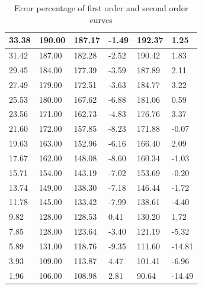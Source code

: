 \begin{table}[!hbt]
\begin{tabular}{|ll|l|l|l|l|}
\multicolumn{1}{|l|}{33.38} & 190.00 & 187.17 & -1.49 & 192.37 & 1.25 \\ \hline
\multicolumn{1}{|l|}{31.42} & 187.00 & 182.28 & -2.52 & 190.42 & 1.83 \\ \hline
\multicolumn{1}{|l|}{29.45} & 184.00 & 177.39 & -3.59 & 187.89 & 2.11 \\ \hline
\multicolumn{1}{|l|}{27.49} & 179.00 & 172.51 & -3.63 & 184.77 & 3.22 \\ \hline
\multicolumn{1}{|l|}{25.53} & 180.00 & 167.62 & -6.88 & 181.06 & 0.59 \\ \hline
\multicolumn{1}{|l|}{23.56} & 171.00 & 162.73 & -4.83 & 176.76 & 3.37 \\ \hline
\multicolumn{1}{|l|}{21.60} & 172.00 & 157.85 & -8.23 & 171.88 & -0.07 \\ \hline
\multicolumn{1}{|l|}{19.63} & 163.00 & 152.96 & -6.16 & 166.40 & 2.09 \\ \hline
\multicolumn{1}{|l|}{17.67} & 162.00 & 148.08 & -8.60 & 160.34 & -1.03 \\ \hline
\multicolumn{1}{|l|}{15.71} & 154.00 & 143.19 & -7.02 & 153.69 & -0.20 \\ \hline
\multicolumn{1}{|l|}{13.74} & 149.00 & 138.30 & -7.18 & 146.44 & -1.72 \\ \hline
\multicolumn{1}{|l|}{11.78} & 145.00 & 133.42 & -7.99 & 138.61 & -4.40 \\ \hline
\multicolumn{1}{|l|}{9.82} & 128.00 & 128.53 & 0.41 & 130.20 & 1.72 \\ \hline
\multicolumn{1}{|l|}{7.85} & 128.00 & 123.64 & -3.40 & 121.19 & -5.32 \\ \hline
\multicolumn{1}{|l|}{5.89} & 131.00 & 118.76 & -9.35 & 111.60 & -14.81 \\ \hline
\multicolumn{1}{|l|}{3.93} & 109.00 & 113.87 & 4.47 & 101.41 & -6.96 \\ \hline
\multicolumn{1}{|l|}{1.96} & 106.00 & 108.98 & 2.81 & 90.64 & -14.49 \\ \hline
\end{tabular}
\caption{Error percentage of first order and second order curves}
\end{table}
